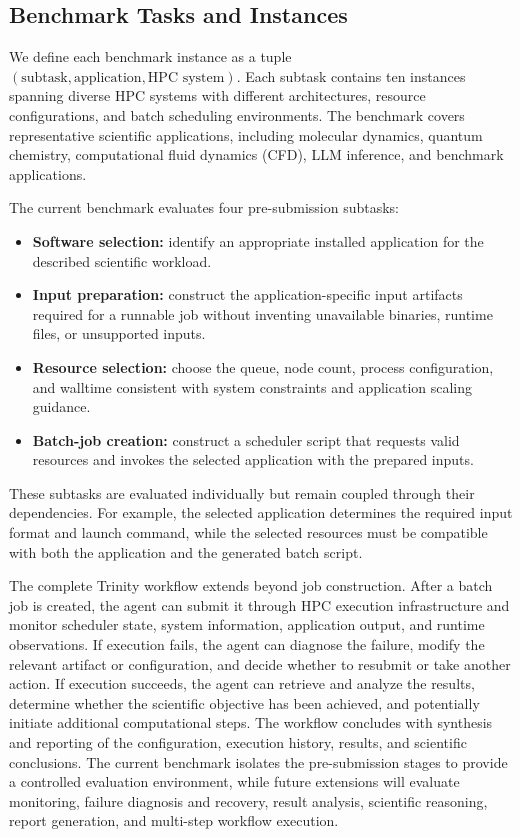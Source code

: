 \documentclass[conference]{IEEEtran}
\begin{document}
\subsection{Benchmark Tasks and Instances}

We define each benchmark instance as a tuple $(\text{subtask}, \text{application}, \text{HPC system})$. Each subtask contains ten instances spanning diverse HPC systems with different architectures, resource configurations, and batch scheduling environments. The benchmark covers representative scientific applications, including molecular dynamics, quantum chemistry, computational fluid dynamics (CFD), LLM inference, and benchmark applications.

The current benchmark evaluates four pre-submission subtasks:

\begin{itemize}
    \item \textbf{Software selection:} identify an appropriate installed application for the described scientific workload.
    
    \item \textbf{Input preparation:} construct the application-specific input artifacts required for a runnable job without inventing unavailable binaries, runtime files, or unsupported inputs.
    
    \item \textbf{Resource selection:} choose the queue, node count, process configuration, and walltime consistent with system constraints and application scaling guidance.
    
    \item \textbf{Batch-job creation:} construct a scheduler script that requests valid resources and invokes the selected application with the prepared inputs.
\end{itemize}

These subtasks are evaluated individually but remain coupled through their dependencies. For example, the selected application determines the required input format and launch command, while the selected resources must be compatible with both the application and the generated batch script.

The complete Trinity workflow extends beyond job construction. After a batch job is created, the agent can submit it through HPC execution infrastructure and monitor scheduler state, system information, application output, and runtime observations. If execution fails, the agent can diagnose the failure, modify the relevant artifact or configuration, and decide whether to resubmit or take another action. If execution succeeds, the agent can retrieve and analyze the results, determine whether the scientific objective has been achieved, and potentially initiate additional computational steps. The workflow concludes with synthesis and reporting of the configuration, execution history, results, and scientific conclusions. The current benchmark isolates the pre-submission stages to provide a controlled evaluation environment, while future extensions will evaluate monitoring, failure diagnosis and recovery, result analysis, scientific reasoning, report generation, and multi-step workflow execution.
\end{document}

